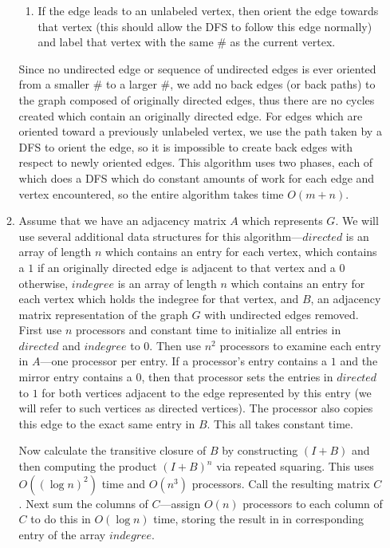 \documentclass{article}
\begin{document}
\begin{enumerate}
\begin{enumerate}
\begin{enumerate}
	\item If the edge leads to an unlabeled vertex, then orient the edge towards that vertex (this should allow the DFS to follow this edge normally) and label that vertex with the same $\#$ as the current vertex.
\end{enumerate}

\par Since no undirected edge or sequence of undirected edges is ever oriented from a smaller $\#$ to a larger $\#$, we add no back edges (or back paths) to the graph composed of originally directed edges, thus there are no cycles created which contain an originally directed edge. For edges which are oriented toward a previously unlabeled vertex, we use the path taken by a DFS to orient the edge, so it is impossible to create back edges with respect to newly oriented edges. This algorithm uses two phases, each of which does a DFS which do constant amounts of work for each edge and vertex encountered, so the entire algorithm takes time $O(m + n)$.

\item Assume that we have an adjacency matrix $A$ which represents $G$. We will use several additional data structures for this algorithm---$directed$ is an array of length $n$ which contains an entry for each vertex, which contains a $1$ if an originally directed edge is adjacent to that vertex and a $0$ otherwise, $indegree$ is an array of length $n$ which contains an entry for each vertex which holds the indegree for that vertex, and $B$, an adjacency matrix representation of the graph $G$ with undirected edges removed.  First use $n$ processors and constant time to initialize all entries in $directed$ and $indegree$ to $0$. Then use $n^2$ processors to examine each entry in $A$---one processor per entry.  If a processor's entry contains a $1$ and the mirror entry contains a $0$, then that processor sets the entries in $directed$ to $1$ for both vertices adjacent to the edge represented by this entry (we will refer to such vertices as directed vertices). The processor also copies this edge to the exact same entry in $B$. This all takes constant time.

\par Now calculate the transitive closure of $B$ by constructing $(I+B)$ and then computing the product $(I+B)^n$ via repeated squaring. This uses $O((\log n)^2)$ time and $O(n^3)$ processors. Call the resulting matrix $C$. Next sum the columns of $C$---assign $O(n)$ processors to each column of $C$ to do this in $O(\log n)$ time, storing the result in in corresponding entry of the array $indegree$.


\end{enumerate}
\end{enumerate}
\end{document}
